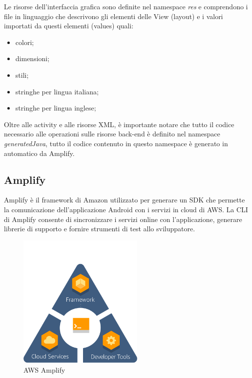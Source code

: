 Le risorse dell'interfaccia grafica sono definite nel namespace \textit{res} e comprendono i file in linguaggio  che descrivono gli elementi delle View (layout) e i valori importati da questi elementi (values) quali: 
\begin{itemize}
\item colori;
\item dimensioni;
\item stili;
\item stringhe per lingua italiana;
\item stringhe per lingua inglese;
\end{itemize}

Oltre alle activity e alle risorse XML, è importante notare che tutto il codice necessario alle operazioni sulle risorse back-end è definito nel namespace \textit{generatedJava}, tutto il codice contenuto in questo namespace è generato in automatico da Amplify.

\subsection{Amplify}
Amplify è il framework di Amazon utilizzato per generare un SDK che permette la comunicazione dell'applicazione Android con i servizi in cloud di AWS. La CLI di Amplify consente di sincronizzare i servizi online con l'applicazione, generare librerie di supporto e fornire strumenti di test allo sviluppatore.

\begin{figure}[H]
	\begin{center}
		\includegraphics[width=0.55\textwidth, keepaspectratio]{../includes/pics/amplify.png}
		\caption{AWS Amplify}
	\end{center}
\end{figure}

